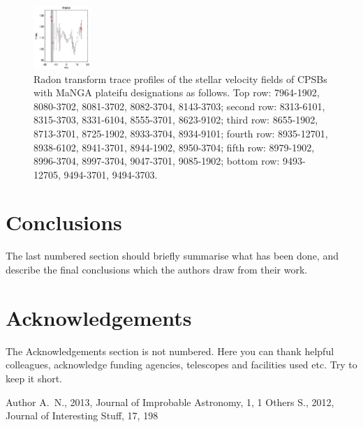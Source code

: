 \documentclass[fleqn,usenatbib]{mnras}
\begin{document}
\begin{figure}
    \includegraphics[width=0.19\textwidth]{Images/trace-plots/trace-plots-cpsbs/9494-3703.png}
    \caption{Radon transform trace profiles of the stellar velocity fields of CPSBs with MaNGA plateifu designations as follows. Top row: 7964-1902, 8080-3702, 8081-3702, 8082-3704, 8143-3703; second row: 8313-6101, 8315-3703, 8331-6104, 8555-3701, 8623-9102; third row: 8655-1902, 8713-3701, 8725-1902, 8933-3704, 8934-9101; fourth row: 8935-12701, 8938-6102, 8941-3701, 8944-1902, 8950-3704; fifth row: 8979-1902, 8996-3704, 8997-3704, 9047-3701, 9085-1902; bottom row: 9493-12705, 9494-3701, 9494-3703.}
    \label{fig:Radon-traces-CPSBs}
\end{figure}



\section{Conclusions}

The last numbered section should briefly summarise what has been done, and describe the final conclusions which the authors draw from their work.

\section*{Acknowledgements}

The Acknowledgements section is not numbered. Here you can thank helpful colleagues, acknowledge funding agencies, telescopes and facilities used etc.
Try to keep it short.






\begin{thebibliography}{99}
Author A.~N., 2013, Journal of Improbable Astronomy, 1, 1
Others S., 2012, Journal of Interesting Stuff, 17, 198
\end{thebibliography}
\end{document}
